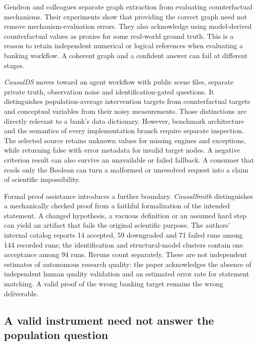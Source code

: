 Gendron and colleagues separate graph extraction from evaluating counterfactual
mechanisms. Their experiments show that providing the correct graph need not
remove mechanism-evaluation errors. They also acknowledge using model-derived
counterfactual values as proxies for some real-world ground truth. This is a
reason to retain independent numerical or logical references when evaluating a
banking workflow. A coherent graph and a confident answer can fail at different
stages. \citep{v12_la_2410_06392}

\emph{CausalDS} moves toward an agent workflow with public scene files, separate
private truth, observation noise and identification-gated questions. It
distinguishes population-average intervention targets from counterfactual targets
and conceptual variables from their noisy measurements. Those distinctions are
directly relevant to a bank's data dictionary. However, benchmark architecture
and the semantics of every implementation branch require separate inspection.
The selected source retains unknown values for missing engines and exceptions,
while returning false with error metadata for invalid target nodes. A negative
criterion result can also survive an unavailable or failed fallback. A consumer
that reads only the Boolean can turn a malformed or unresolved request into a
claim of scientific impossibility. \citep{v12_la_2607_08093,exec14_ident_packages}

Formal proof assistance introduces a further boundary. \emph{CausalSmith}
distinguishes a mechanically checked proof from a faithful formalization of the
intended statement. A changed hypothesis, a vacuous definition or an assumed
hard step can yield an artifact that fails the original scientific purpose.
The authors' internal catalog reports 14 accepted, 59 downgraded and 71 failed
runs among 144 recorded runs; the identification and structural-model clusters
contain one acceptance among 94 runs. Reruns count separately. These are not
independent estimates of autonomous research quality: the paper acknowledges
the absence of independent human quality validation and an estimated error rate
for statement matching. A valid proof of the wrong banking target remains the
wrong deliverable. \citep{exec13_census_causalsmith}

\subsection{A valid instrument need not answer the population question}


